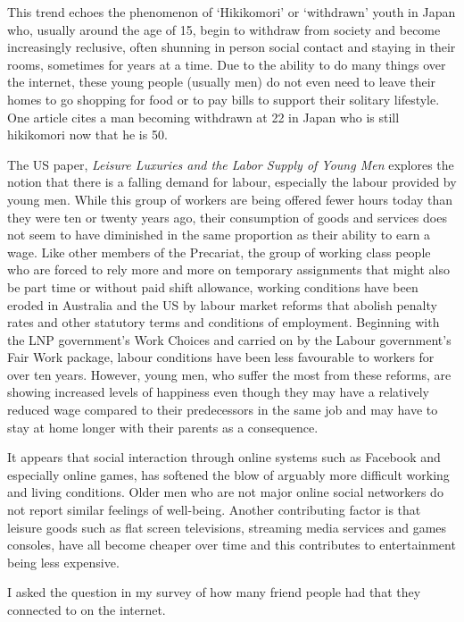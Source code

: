 This trend echoes the phenomenon of `Hikikomori' or `withdrawn' youth in Japan who, usually around the age of 15, begin to withdraw from society and become increasingly reclusive, often shunning in person social contact and staying in their rooms, sometimes for years at a time. Due to the ability to do many things over the internet, these young people (usually men) do not even need to leave their homes to go shopping for food or to pay bills to support their solitary lifestyle. One article cites a man becoming withdrawn at 22 in Japan who is still hikikomori now that he is 50\cite{RefWorks:338}. 

The US paper, \emph{Leisure Luxuries and the Labor Supply of Young Men}\cite{RefWorks:318} explores the notion that there is a falling demand for labour, especially the labour provided by young men. While this group of workers are being offered fewer hours today than they were ten or twenty years ago, their consumption of goods and services does not seem to have diminished in the same proportion as their ability to earn a wage. Like other members of the Precariat, the group of working class people who are forced to rely more and more on temporary assignments that might also be part time or without paid shift allowance, working conditions have been eroded in Australia and the US by labour market reforms that abolish penalty rates and other statutory terms and conditions of employment. Beginning with the LNP government's Work Choices and carried on by the Labour government's Fair Work package, labour conditions have been less favourable to workers for over ten years. However, young men, who suffer the most from these reforms, are showing increased levels of happiness even though they may have a relatively reduced wage compared to their predecessors in the same job and may have to stay at home longer with their parents as a consequence.

It appears that social interaction through online systems such as Facebook and especially online games, has softened the blow of arguably more difficult working and living conditions. Older men who are not major online social networkers do not report similar feelings of well-being. Another contributing factor is that leisure goods such as flat screen televisions, streaming media services and games consoles, have all become cheaper over time and this contributes to entertainment being less expensive. 

I asked the question in my survey of how many friend people had that they connected to on the internet.

